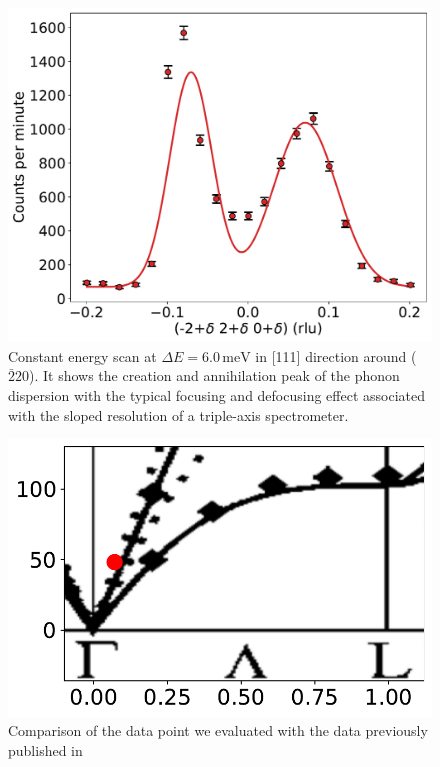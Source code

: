 \documentclass[aps,prx,reprint,amsmath,amssymb,superscriptaddress,showpacs]{revtex4-1}
\begin{document}
\begin{figure}
    \includegraphics[width=1.0\linewidth]{energy-scan.pdf}
    \caption{\label{fig1} Constant energy scan at $\Delta E = 6.0\,\mathrm{meV}$ in [111] direction around ($\bar{2}20$). It shows the creation and annihilation peak of the phonon dispersion with the typical focusing and defocusing effect associated with the sloped resolution of a triple-axis spectrometer.}
\end{figure}

\begin{figure}
    \includegraphics[width=1.0\linewidth]{dispersion.pdf}
    \caption{Comparison of the data point we evaluated with the data previously published in \cite{Aouissi} }
    \label{fig2}
\end{figure}
\end{document}
